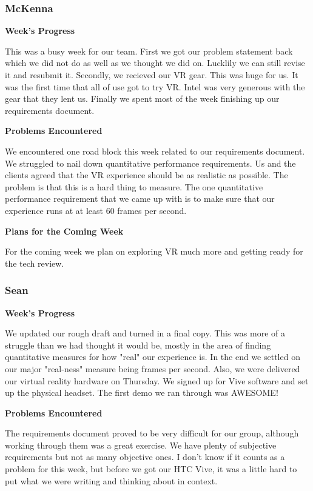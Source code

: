 \documentclass[10pt,journal,compsoc,onecolumn, draftclsnofoot]{IEEEtran}
\begin{document}
\subsubsection{McKenna}
\noindent \textbf{Week's Progress}

This was a busy week for our team. First we got our problem statement back which we did not do as well as we thought we did on. Lucklily we can still revise it and resubmit it. Secondly, we recieved our VR gear. This was huge for us. It was the first time that all of use got to try VR. Intel was very generous with the gear that they lent us. Finally we spent most of the week finishing up our requirements document.

\noindent \textbf{Problems Encountered}

We encountered one road block this week related to our requirements document. We struggled to nail down quantitative performance requirements. Us and the clients agreed that the VR experience should be as realistic as possible. The problem is that this is a hard thing to measure. The one quantitative performance requirement that we came up with is to make sure that our experience runs at at least 60 frames per second.

\noindent \textbf{Plans for the Coming Week}

For the coming week we plan on exploring VR much more and getting ready for the tech review.

\subsubsection{Sean}
\noindent \textbf{Week's Progress}

We updated our rough draft and turned in a final copy.  This was more of a struggle than we had thought it would be, mostly in the area of finding quantitative measures for how "real" our experience is. In the end we settled on our major "real-ness" measure being frames per second.  Also, we were delivered our virtual reality hardware on Thursday.  We signed up for Vive software and set up the physical headset.  The first demo we ran through was AWESOME!

\noindent \textbf{Problems Encountered}

The requirements document proved to be very difficult for our group, although working through them was a great exercise. We have plenty of subjective requirements but not as many objective ones. I don't know if it counts as a problem for this week, but before we got our HTC Vive, it was a little hard to put what we were writing and thinking about in context.
\end{document}
